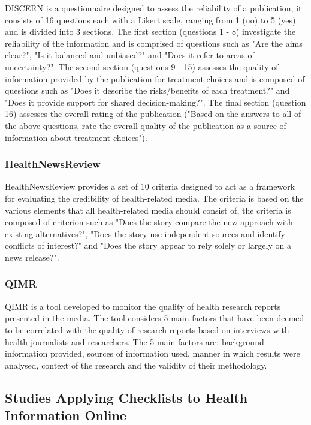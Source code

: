 \documentclass[a4paper,twoside,phd]{BYUPhys}
\begin{document}
DISCERN \cite{DISCERN} is a questionnaire designed to assess the reliability of a publication, it consists of 16 questions each with a Likert scale, ranging from 1 (no) to 5 (yes) and is divided into 3 sections. The first section (questions 1 - 8) investigate the reliability of the information and is comprised of questions such as "Are the aims clear?", "Is it balanced and unbiased?" and "Does it refer to areas of uncertainty?". The second section (questions 9 - 15) assesses the quality of information provided by the publication for treatment choices and is composed of questions such as "Does it describe the risks/benefits of each treatment?" and "Does it provide support for shared decision-making?". The final section (question 16) assesses the overall rating of the publication ("Based on the answers to all of the above questions, rate the overall quality of the publication as a source of information about treatment choices").


\subsubsection{HealthNewsReview}
\label{sec:HealthNewsReview}

HealthNewsReview \cite{HealthNewsReview} provides a set of 10 criteria designed to act as a framework for evaluating the credibility of health-related media. The criteria is based on the various elements that all health-related media should consist of, the criteria is composed of criterion such as "Does the story compare the new approach with existing alternatives?", "Does the story use independent sources and identify conflicts of interest?" and "Does the story appear to rely solely or largely on a news release?".

\subsubsection{QIMR}
\label{sec:QIMR}

QIMR \cite{QIMR} is a tool developed to monitor the quality of health research reports presented in the media. The tool considers 5 main factors that have been deemed to be correlated with the quality of research reports based on interviews with health journalists and researchers. The 5 main factors are: background information provided, sources of information used, manner in which results were analysed, context of the research and the validity of their methodology.

\subsection{Studies Applying Checklists to Health Information Online}
\label{sec:ChecklistStudies}
\end{document}
